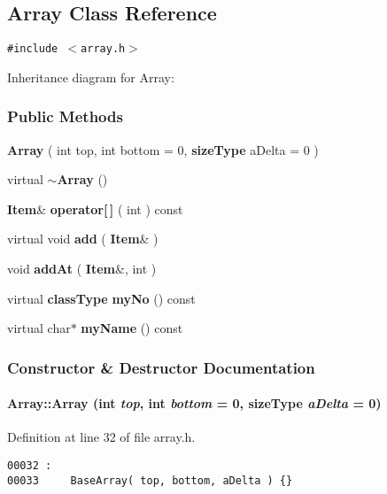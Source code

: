 \subsection{Array  Class Reference}
\label{Array}
{\tt \#include $<$array.h$>$}

Inheritance diagram for Array:\begin{figure}[H]
\begin{center}
\leavevmode
\setlength{\epsfysize}{6cm}
\end{center}
\end{figure}
\subsubsection*{Public Methods}
\begin{CompactItemize}
\item 
{\bf Array} ( int top, int bottom = 0, {\bf size\-Type} a\-Delta = 0 )
\item 
virtual {\bf $\sim$Array} ()
\item 
{\bf Item}\& {\bf operator[$\,$]} ( int ) const
\item 
virtual void {\bf add} ( {\bf Item}\& )
\item 
void {\bf add\-At} ( {\bf Item}\&, int )
\item 
virtual {\bf class\-Type} {\bf my\-No} () const
\item 
virtual char$\ast$ {\bf my\-Name} () const
\end{CompactItemize}


\subsubsection{Constructor \& Destructor Documentation}
\label{Array_a0}
\paragraph{\setlength{\rightskip}{0pt plus 5cm}Array::Array (int {\em top}, int {\em bottom} = 0, {\bf size\-Type} {\em a\-Delta} = 0)}\hfill



Definition at line 32 of file array.h.\small\begin{verbatim}00032 :
00033     BaseArray( top, bottom, aDelta ) {}

\end{verbatim}\normalsize 
\label{Array_a1}

